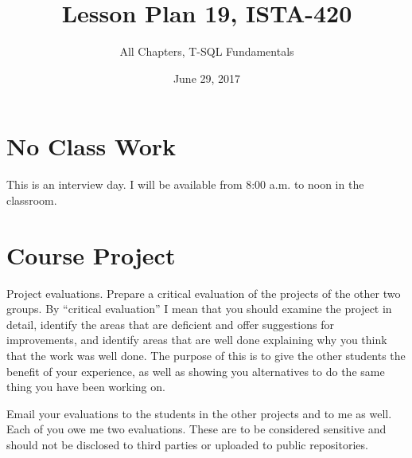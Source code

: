 \documentclass{article}
\title{Lesson Plan 19, ISTA-420}
\author{All Chapters, T-SQL Fundamentals}
\date{June 29, 2017}
\begin{document}
    

    \maketitle{}


    \section{No Class Work}

    This is an interview day. I will be available from 8:00 a.m. to noon in the classroom.

    \section{Course Project}

    Project evaluations. Prepare a critical evaluation of the projects of the other two groups. By ``critical evaluation'' I mean that you should examine the project in detail, identify the areas that are deficient and offer suggestions for improvements, and identify areas that are well done explaining why you think that the work was well done. The purpose of this is to give the other students the benefit of your experience, as well as showing you alternatives to do the same thing you have been working on.

    Email your evaluations to the students in the other projects and to me as well. Each of you owe me two evaluations. These are to be considered sensitive and should not be disclosed to third parties or uploaded to public repositories.
\end{document}
